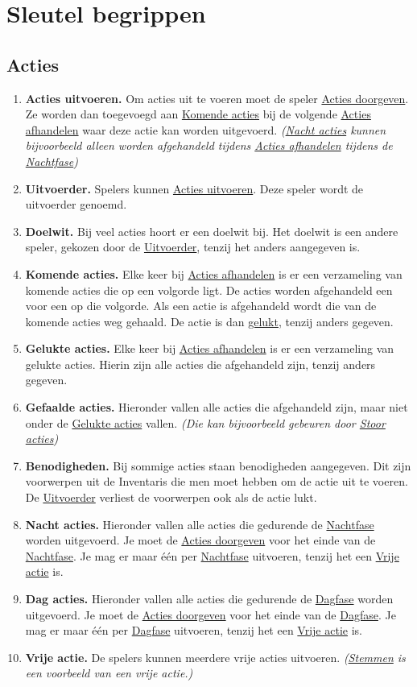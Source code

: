 \documentclass{article}
\newenvironment{rulesubsection}[1]{
    \subsection{#1} \label{rule:#1}
    \begin{enumerate}[label=\thesubsection.\arabic{enumi}]
}{
    \end{enumerate}
}
\newcommand{\ruleitem}[1]{\item \label{rule:#1} \textbf{#1.}}
\newcommand{\ruleref}[1]{\hyperref[rule:#1]{#1}}
\begin{document}
\section{Sleutel begrippen}
\begin{rulesubsection}{Acties}
    \ruleitem{Acties uitvoeren} Om acties uit te voeren moet de speler \ruleref{Acties doorgeven}.
    Ze worden dan toegevoegd aan \ruleref{Komende acties} bij de volgende \ruleref{Acties afhandelen} waar deze actie kan worden
    uitgevoerd. \textit{(\ruleref{Nacht acties} kunnen bijvoorbeeld alleen worden afgehandeld tijdens \ruleref{Acties afhandelen} tijdens de \ruleref{Nachtfase})}
    \ruleitem{Uitvoerder} Spelers kunnen \ruleref{Acties uitvoeren}. Deze speler wordt de uitvoerder genoemd.
    \ruleitem{Doelwit} Bij veel acties hoort er een doelwit bij. Het doelwit is een andere speler, gekozen door de \ruleref{Uitvoerder},
    tenzij het anders aangegeven is.
    \ruleitem{Komende acties} Elke keer bij \ruleref{Acties afhandelen} is er een verzameling van komende acties die op een volgorde ligt.
    De acties worden afgehandeld een voor een op die volgorde. Als een actie is afgehandeld wordt die van de komende acties weg gehaald.
    De actie is dan \hyperref[rule:Gelukte acties]{gelukt}, tenzij anders gegeven.
    \ruleitem{Gelukte acties} Elke keer bij \ruleref{Acties afhandelen} is er een verzameling van gelukte acties. Hierin zijn alle acties die afgehandeld zijn,
    tenzij anders gegeven.
    \ruleitem{Gefaalde acties} Hieronder vallen alle acties die afgehandeld zijn, maar niet onder de \ruleref{Gelukte acties} vallen.
    \textit{(Die kan bijvoorbeeld gebeuren door \ruleref{Stoor acties})}
    \ruleitem{Benodigheden} Bij sommige acties staan benodigheden aangegeven. Dit zijn voorwerpen uit de Inventaris die men moet hebben om de actie
    uit te voeren. De \ruleref{Uitvoerder} verliest de voorwerpen ook als de actie lukt.
    \ruleitem{Nacht acties} Hieronder vallen alle acties die gedurende de \ruleref{Nachtfase} worden uitgevoerd. 
    Je moet de \ruleref{Acties doorgeven} voor het einde van de \ruleref{Nachtfase}. Je mag er maar één per \ruleref{Nachtfase} uitvoeren,
    tenzij het een \ruleref{Vrije actie} is.
    \ruleitem{Dag acties} Hieronder vallen alle acties die gedurende de \ruleref{Dagfase} worden uitgevoerd.
    Je moet de \ruleref{Acties doorgeven} voor het einde van de \ruleref{Dagfase}. Je mag er maar één per \ruleref{Dagfase} uitvoeren,
    tenzij het een \ruleref{Vrije actie} is.
    \ruleitem{Vrije actie} De spelers kunnen meerdere vrije acties uitvoeren. \textit{(\ruleref{Stemmen} is een voorbeeld van een vrije actie.)}

\end{rulesubsection}
\end{document}
